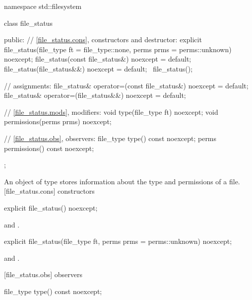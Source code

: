 %
\begin{codeblock}
namespace std::filesystem {
  class file_status {
  public:
    // \ref{file_status.cons}, constructors and destructor:
    explicit file_status(file_type ft = file_type::none,
                         perms prms = perms::unknown) noexcept;
    file_status(const file_status&) noexcept = default;
    file_status(file_status&&) noexcept = default;
   ~file_status();

    // assignments:
    file_status& operator=(const file_status&) noexcept = default;
    file_status& operator=(file_status&&) noexcept = default;

    // \ref{file_status.mods}, modifiers:
    void       type(file_type ft) noexcept;
    void       permissions(perms prms) noexcept;

    // \ref{file_status.obs}, observers:
    file_type  type() const noexcept;
    perms      permissions() const noexcept;
  };
}
\end{codeblock}

\pnum
An object of type  stores information about the type
and permissions of a file.
[file_status.cons]{ constructors}

%
\begin{itemdecl}
explicit file_status() noexcept;
\end{itemdecl}

\begin{itemdescr}
\pnum
\postconditions {} and .
\end{itemdescr}

%
\begin{itemdecl}
explicit file_status(file_type ft, perms prms = perms::unknown) noexcept;
\end{itemdecl}

\begin{itemdescr}
\pnum
\postconditions {} and .
\end{itemdescr}

[file_status.obs]{ observers}

%
\begin{itemdecl}
file_type type() const noexcept;
\end{itemdecl}

